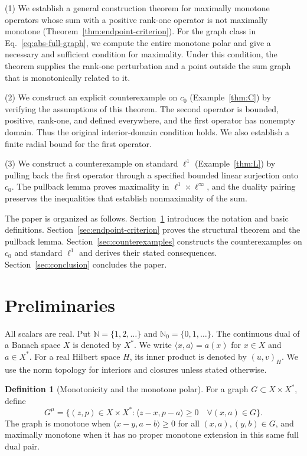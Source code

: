 \documentclass[11pt]{article}
\newcommand{\N}{\mathbb N}
\newcommand{\Nzero}{\mathbb N_0}
\newcommand{\pair}[2]{\langle #1,#2\rangle}
\theoremstyle{definition}
\newtheorem{definition}{Definition}
\theoremstyle{remark}
\begin{document}
(1) We establish a general construction theorem for maximally monotone
operators whose sum with a positive rank-one operator is not maximally
monotone (Theorem~\ref{thm:endpoint-criterion}). For the graph class in
Eq.~\eqref{eq:abs-full-graph}, we compute the entire monotone polar and
give a necessary and sufficient condition for maximality. Under this
condition, the theorem supplies the rank-one perturbation and a point
outside the sum graph that is monotonically related to it.

(2) We construct an explicit counterexample on $c_0$
(Example~\ref{thm:C}) by verifying the assumptions of this theorem.
The second operator is bounded, positive, rank-one, and defined everywhere,
and the first operator has nonempty domain. Thus the original
interior-domain condition holds. We also establish a finite radial
bound for the first operator.

(3) We construct a counterexample on standard $\ell^1$
(Example~\ref{thm:L}) by pulling back the first operator through a
specified bounded linear surjection onto $c_0$. The pullback lemma
proves maximality in $\ell^1\times\ell^\infty$, and the duality pairing
preserves the inequalities that establish nonmaximality of the sum.

The paper is organized as follows. Section~\ref{sec:definitions}
introduces the notation and basic definitions.
Section~\ref{sec:endpoint-criterion} proves the structural theorem and
the pullback lemma. Section~\ref{sec:counterexamples} constructs the
counterexamples on $c_0$ and standard $\ell^1$ and derives their stated
consequences. Section~\ref{sec:conclusion} concludes the paper. 


\section{Preliminaries}
\label{sec:definitions}
All scalars are real. Put $\N=\{1,2,\ldots\}$ and $\Nzero=\{0,1,\ldots\}$.
The continuous dual of a Banach space $X$ is denoted by $X^*$.
We write $\pair{x}{a}=a(x)$ for $x\in X$ and $a\in X^*$.
For a real Hilbert space $H$, its inner product is denoted by
$(u,v)_H$. We use the norm topology for interiors and closures
unless stated otherwise.

\begin{definition}[Monotonicity and the monotone polar]
For a graph $G\subset X\times X^*$, define
\begin{equation}
G^\mu=\{(z,p)\in X\times X^*:
 \pair{z-x}{p-a}\ge0\quad\forall(x,a)\in G\}.
\label{eq:D1}
\end{equation}
The graph is monotone when $\pair{x-y}{a-b}\ge0$ for all
$(x,a),(y,b)\in G$,
and maximally monotone when it has no proper monotone extension in this same
full dual pair.
\end{definition}
\end{document}
